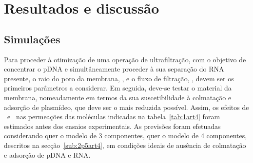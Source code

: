 
\section{Resultados e discussão} %
\label{sec:3art4}
\subsection{Simulações} %
\label{sub:3.1art4}
Para proceder à otimização de uma operação de ultrafiltração, com o objetivo de concentrar o pDNA e simultâneamente proceder à sua separação do RNA presente, o raio do poro da membrana, \raioporo, e o fluxo de filtração, \fluxo, devem ser os primeiros parâmetros a considerar. Em seguida, deve-se testar o material da membrana, nomeadamente em termos da sua suscetibilidade à colmatação e adsorção de plasmídeo, que deve ser o mais reduzida possível. Assim, os efeitos de \raioporo\ e \fluxo\ nas permeações das moléculas indicadas na tabela~\ref{tab:1art4} foram estimados antes dos ensaios experimentais. As previsões foram efetuadas considerando quer o modelo de 3 componentes, quer o modelo de 4 componentes, descritos na secção~\ref{sub:2p5art4}, em condições ideais de ausência de colmatação e adsorção de pDNA e RNA.

